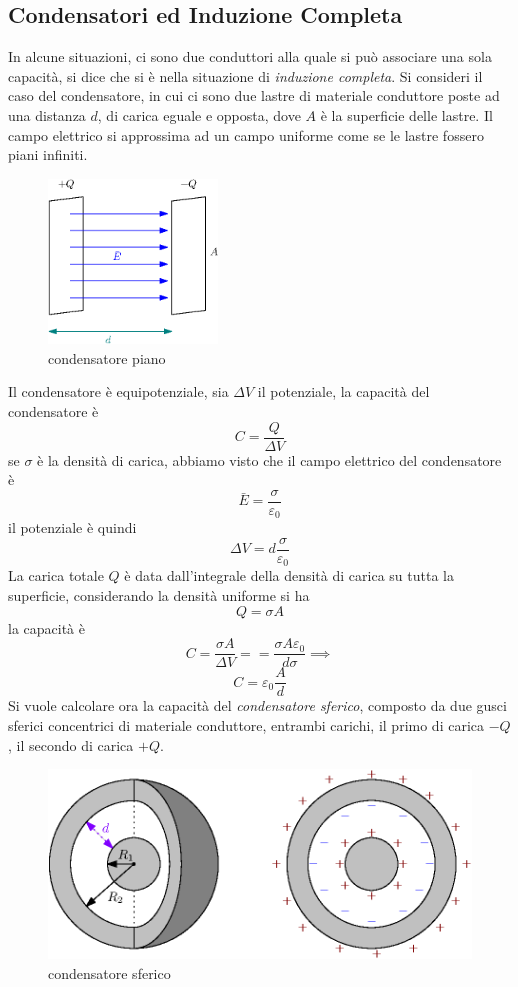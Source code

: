 \documentclass[10pt, letterpaper]{report}
\begin{document}
\subsection{Condensatori ed Induzione Completa}
In alcune situazioni, ci sono due conduttori alla quale si può associare una sola capacità, si dice che si è nella situazione di \textit{induzione completa}. Si consideri il caso del condensatore, in cui ci sono due lastre di materiale conduttore poste ad una distanza $d$, di carica eguale e opposta, dove $A$ è la superficie delle lastre. Il campo elettrico si approssima ad un campo uniforme come se le lastre fossero piani infiniti.\begin{figure}[h!]
    \centering
    \includegraphics[width=0.4\textwidth]{images/condensatore.eps}
    \caption{condensatore piano}
\end{figure}
Il condensatore è equipotenziale, sia $\Delta V$ il potenziale, la capacità del condensatore è 
$$ C=\frac{Q}{\Delta V}$$
se $\sigma$ è la densità di carica, abbiamo visto che il campo elettrico del condensatore è 
$$ \bar E = \frac{\sigma}{\varepsilon_0}$$il potenziale è quindi 
$$ \Delta V = d\frac{\sigma}{\varepsilon_0}$$
La carica totale $Q$ è data dall'integrale della densità di carica su tutta la superficie, considerando la densità uniforme si ha $$Q=\sigma A$$
la capacità è $$ C=\frac{\sigma A}{\Delta V}==\frac{\sigma A \varepsilon_0}{d \sigma}\implies $$
$$ C=\varepsilon_0\frac{A}{d}$$ 
Si vuole calcolare ora la capacità del \textit{condensatore sferico}, composto da due gusci sferici concentrici di materiale conduttore, entrambi carichi, il primo di carica $-Q$, il secondo di carica $+Q$.\begin{figure}[h!]
    \centering
    \includegraphics[width=1\textwidth]{images/condensatoreSferico.eps}
    \caption{condensatore sferico}
\end{figure}
\end{document}
